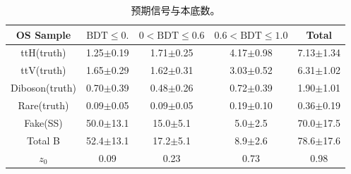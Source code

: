 \begin{table}[htbp]
\begin{center}
\begin{tabular}{c|c|c|c|c}\hline
OS Sample & $\text{BDT}\le0.$  & $0<\text{BDT}\le 0.6$ & $0.6<\text{BDT}\le 1.0$ & Total \\ \hline
ttH(truth) & 1.25$\pm$0.19 & 1.71$\pm$0.25 & 4.17$\pm$0.98 & 7.13$\pm$1.34 \\
ttV(truth) & 1.65$\pm$0.29 & 1.62$\pm$0.31 & 3.03$\pm$0.52  & 6.31$\pm$1.02\\
Diboson(truth) & 0.70$\pm$0.39 & 0.48$\pm$0.26 & 0.72$\pm$0.39 & 1.90$\pm$1.01\\
Rare(truth) & 0.09$\pm$0.05 & 0.09$\pm$0.05 & 0.19$\pm$0.10 & 0.36$\pm$0.19\\
Fake(SS) & 50.0$\pm$13.1 & 15.0$\pm$5.1 & 5.0$\pm$2.5 & 70.0$\pm$17.5\\
Total B & 52.4$\pm$13.1 & 17.2$\pm$5.1 & 8.9$\pm$2.6 & 78.6$\pm$17.6\\ \hline
$z_0$ & 0.09 & 0.23 & 0.73 & 0.98\\ \hline
\end{tabular}
\caption{预期信号与本底数。}
\label{Tab:1l2tau.summary}
\end{center}
\end{table}

